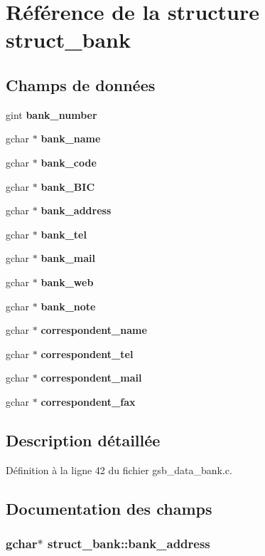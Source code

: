 \section{Référence de la structure struct\_\-bank}
\label{structstruct__bank}
\subsection*{Champs de données}
\begin{DoxyCompactItemize}
\item 
gint {\bf bank\_\-number}
\item 
gchar $\ast$ {\bf bank\_\-name}
\item 
gchar $\ast$ {\bf bank\_\-code}
\item 
gchar $\ast$ {\bf bank\_\-BIC}
\item 
gchar $\ast$ {\bf bank\_\-address}
\item 
gchar $\ast$ {\bf bank\_\-tel}
\item 
gchar $\ast$ {\bf bank\_\-mail}
\item 
gchar $\ast$ {\bf bank\_\-web}
\item 
gchar $\ast$ {\bf bank\_\-note}
\item 
gchar $\ast$ {\bf correspondent\_\-name}
\item 
gchar $\ast$ {\bf correspondent\_\-tel}
\item 
gchar $\ast$ {\bf correspondent\_\-mail}
\item 
gchar $\ast$ {\bf correspondent\_\-fax}
\end{DoxyCompactItemize}


\subsection{Description détaillée}


Définition à la ligne 42 du fichier gsb\_\-data\_\-bank.c.



\subsection{Documentation des champs}
\subsubsection[{bank\_\-address}]{\setlength{\rightskip}{0pt plus 5cm}gchar$\ast$ {\bf struct\_\-bank::bank\_\-address}}\label{structstruct__bank_ae2bea3f908f2bfd7b563c963c6331500}


